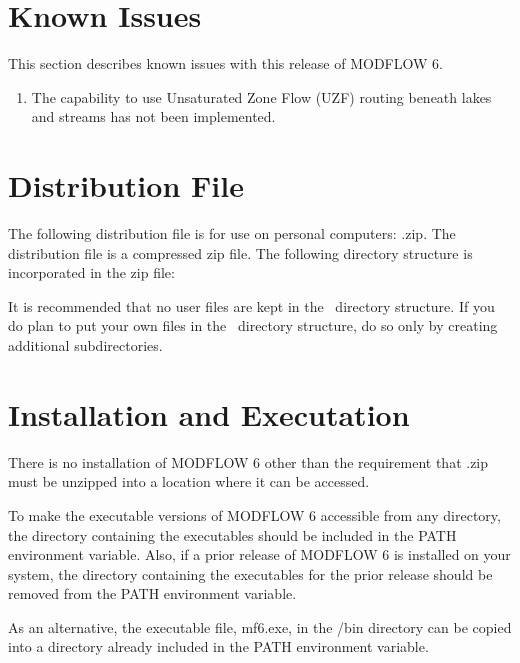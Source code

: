 \documentclass[11pt,twoside,twocolumn]{usgsreport}
\begin{document}
\section{Known Issues}
This section describes known issues with this release of MODFLOW 6.

\begin{enumerate}

\item
The capability to use Unsaturated Zone Flow (UZF) routing beneath lakes and streams has not been implemented.

\end{enumerate}


\section{Distribution File}
The following distribution file is for use on personal computers: \modflowversion.zip.  The distribution file is a compressed zip file. The following directory structure is incorporated in the zip file:



It is recommended that no user files are kept in the \modflowversion~directory structure.  If you do plan to put your own files in the \modflowversion~directory structure, do so only by creating additional subdirectories.

\section{Installation and Executation}
There is no installation of MODFLOW 6 other than the requirement that \modflowversion.zip must be unzipped into a location where it can be accessed.  

To make the executable versions of MODFLOW 6 accessible from any directory, the directory containing the executables should be included in the PATH environment variable.  Also, if a prior release of MODFLOW 6 is installed on your system, the directory containing the executables for the prior release should be removed from the PATH environment variable.

As an alternative, the executable file, mf6.exe, in the \modflowversion{}/bin directory can be copied into a directory already included in the PATH environment variable.
\end{document}
